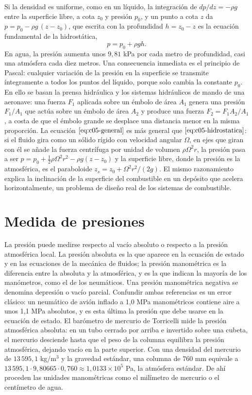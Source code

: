 \documentclass[10pt,openany]{book}
\begin{document}
Si la densidad es uniforme, como en un líquido, la integración de \(dp/dz = -\rho g\) entre la superficie libre, a cota \(z_0\) y presión \(p_0\), y un punto a cota \(z\) da \(p = p_0 - \rho g\,(z - z_0)\), que escrita con la profundidad \(h = z_0 - z\) es la ecuación fundamental de la hidrostática,
\begin{equation}
p = p_0 + \rho g h. \label{eq:c05-hidrostatica}
\end{equation}
En agua, la presión aumenta unos \(9{,}81\) kPa por cada metro de profundidad, casi una atmósfera cada diez metros. Una consecuencia inmediata es el principio de Pascal: cualquier variación de la presión en la superficie se transmite íntegramente a todos los puntos del líquido, porque solo cambia la constante \(p_0\). En ello se basan la prensa hidráulica y los sistemas hidráulicos de mando de una aeronave: una fuerza \(F_1\) aplicada sobre un émbolo de área \(A_1\) genera una presión \(F_1/A_1\) que actúa sobre un émbolo de área \(A_2\) y produce una fuerza \(F_2 = F_1 A_2/A_1\), a costa de que el émbolo grande se desplace una distancia menor en la misma proporción. La ecuación \(\eqref{eq:c05-general}\) es más general que \(\eqref{eq:c05-hidrostatica}\): si el fluido gira como un sólido rígido con velocidad angular \(\Omega\), en ejes que giran con él se añade la fuerza centrífuga por unidad de volumen \(\rho\Omega^{2}r\), la presión pasa a ser \(p = p_0 + \tfrac12\rho\Omega^{2}r^{2} - \rho g(z - z_0)\) y la superficie libre, donde la presión es la atmosférica, es el paraboloide \(z_s = z_0 + \Omega^{2}r^{2}/(2g)\). El mismo razonamiento explica la inclinación de la superficie del combustible en un depósito que acelera horizontalmente, un problema de diseño real de los sistemas de combustible.

\section{Medida de presiones}

La presión puede medirse respecto al vacío absoluto o respecto a la presión atmosférica local. La presión absoluta es la que aparece en la ecuación de estado y en las ecuaciones de la mecánica de fluidos; la presión manométrica es la diferencia entre la absoluta y la atmosférica, y es la que indican la mayoría de los manómetros, como el de los neumáticos. Una presión manométrica negativa se denomina depresión o vacío parcial. Confundir ambas referencias es un error clásico: un neumático de avión inflado a 1,0 MPa manométricos contiene aire a unos 1,1 MPa absolutos, y es esta última la presión que debe usarse en la ecuación de estado. El barómetro de mercurio de Torricelli mide la presión atmosférica absoluta: en un tubo cerrado por arriba e invertido sobre una cubeta, el mercurio desciende hasta que el peso de la columna equilibra la presión atmosférica, dejando vacío en la parte superior. Con una densidad del mercurio de \(13\,595{,}1\) kg/m\(^3\) y la gravedad estándar, una columna de 760 mm equivale a \(13\,595{,}1\cdot 9{,}80665\cdot 0{,}760 \approx 1{,}0133\times 10^{5}\) Pa, la atmósfera estándar. De ahí proceden las unidades manométricas como el milímetro de mercurio o el centímetro de agua.
\end{document}
